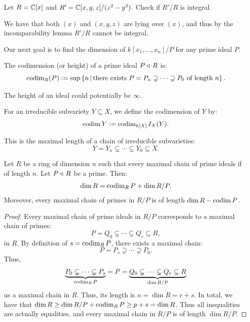 \documentclass[11pt,a4paper]{article}
\begin{document}
\begin{exercise}
  Let $R = \mathbb{C}[x]$ and $R' = \mathbb{C}[x,y,z]/(z^2-y^3)$.
  Check if $R'/R$ is integral.
\end{exercise}
\begin{solution}
  We have that both $(x)$ and $(x,y,z)$ are lying over $(x)$,
  and thus by the incomparability lemma $R'/R$ cannot be integral.
\end{solution}

\begin{remark}
  Our next goal is to find the dimension of $k[x_1,\dots,x_n]/P$
  for any prime ideal $P$.
\end{remark}

\begin{definition}
  The codimension (or height) of a prime ideal $P \triangleleft\, R$
  is:
  \[
    \operatorname{codim}_R(P) :=
      \sup\left\{n \,\middle\vert\,
        \text{there exists $P = P_n \supsetneq \cdots \supsetneq P_0$
        of length $n$}\right\}.
  \]
\end{definition}

\begin{remark}
  The height of an ideal could potentially be $\infty$.
\end{remark}

\begin{definition}
  For an irreducible subvariety $Y \subseteq X$,
  we define the codimension of $Y$ by:
  \[
    \operatorname{codim} Y := \operatorname{codim}_{k[X]} I_X(Y).
  \]
\end{definition}

\begin{remark}
  This is the maximal length of a chain of irreducible subvarieties:
  \[
    Y = Y_n \subsetneq \cdots \subsetneq Y_0 \subseteq X.
  \]
\end{remark}

\begin{proposition}
  \label{prop:dimension-of-quotient}
  Let $R$ be a ring of dimension $n$ such that every maximal chain of
  prime ideals if of length $n$.
  Let $P \triangleleft\, R$ be a prime.
  Then:
  \[
    \dim R = \operatorname{codim}_R P + \dim R/P.
  \]
  Moreover, every maximal chain of primes in $R/P$
  is of length $\dim R - \operatorname{codim} P$.
\end{proposition}
\begin{proof}
  Every maximal chain of prime ideals in $R/P$ corresponds to a maximal
  chain of primes:
  \[
    P = Q_0 \subsetneq \cdots \subsetneq Q_r \subseteq R,
  \]
  in $R$.
  By definition of $s = \operatorname{codim}_R P$, there exists a maximal chain:
  \[
    P = P_s \supsetneq \cdots \supsetneq P_0.
  \]
  Thus,
  \[
    \underbrace{P_0 \subsetneq \cdots \subsetneq P_s}_{\operatorname{codim}_R P} =
    P =
    \underbrace{Q_0 \subsetneq \cdots \subsetneq Q_r \subseteq R}_{\dim R/P}
  \]
  us a maximal chain in $R$.
  Thus, its length is $n = \dim R = r + s$.
  In total,
  we have that $\dim R \geq \dim R/P + \operatorname{codim}_R P \geq p + s = \dim R$.
  Thus all inequalities are actually equalities,
  and every maximal chain in $R/P$ is of length $\dim R/P$.
\end{proof}
\end{document}
